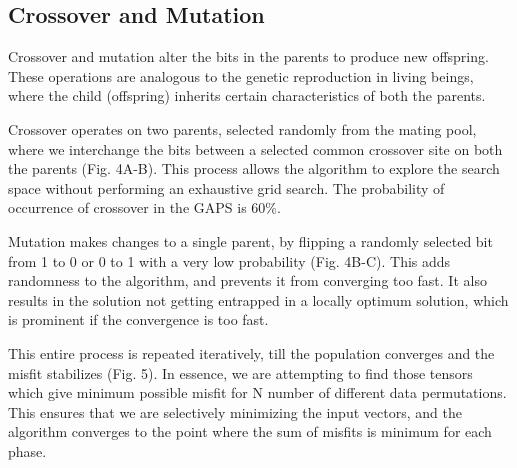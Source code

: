 \subsection{Crossover and Mutation}
Crossover and mutation alter the bits in the parents to produce new offspring. These operations are analogous to the genetic reproduction in living beings, where the child (offspring) inherits certain characteristics of both the parents.

Crossover operates on two parents, selected randomly from the mating pool, where we interchange the bits between a selected common crossover site on both the parents (Fig. 4A-B). This process allows the algorithm to explore the search space without performing an exhaustive grid search. The probability of occurrence of crossover in the GAPS is 60\%. 

Mutation makes changes to a single parent, by flipping a randomly selected bit from 1 to 0 or 0 to 1 with a very low probability (Fig. 4B-C). This adds randomness to the algorithm, and prevents it from converging too fast. It also results in the solution not getting entrapped in a locally optimum solution, which is prominent if the convergence is too fast. 

This entire process is repeated iteratively, till the population converges and the misfit stabilizes (Fig. 5). In essence, we are attempting to find those tensors which give minimum possible misfit for N number of different data permutations. This ensures that we are selectively minimizing the input vectors, and the algorithm converges to the point where the sum of misfits is minimum for each phase.

